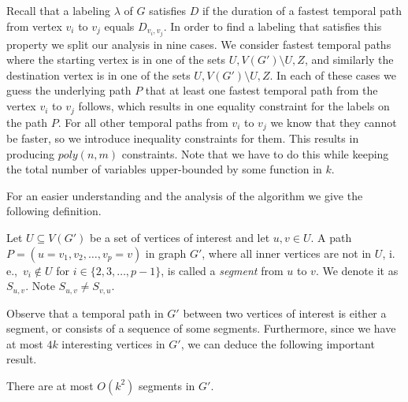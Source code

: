 \documentclass[a4paper,UKenglish,cleveref, autoref, thm-restate]{lipics-v2021}
\newcommand{\ie}{i.\,e.,\ }
\newcommand{\deltaExact}{\textsc{Periodic TGR}}
\begin{document}
Recall that a labeling $\lambda$ of $G$ satisfies $D$ if the duration of a fastest temporal path from vertex $v_i$ to $v_j$ equals $D_{v_i, v_j}$.
In order to find a labeling that satisfies this property we split our analysis in nine cases.
We consider fastest temporal paths 
where the starting vertex is in one of the sets $U,V(G') \setminus U, Z$,
and similarly the destination vertex is in one of the sets $U,V(G') \setminus U, Z$.
In each of these cases we guess the underlying path $P$ that at least one fastest temporal path from the vertex $v_i$ to $v_j$ follows, 
which results in one equality constraint for the labels on the path $P$. 
For all other temporal paths from $v_i$ to $v_j$ we know that they cannot be faster, so we introduce inequality constraints for them.
This results in producing $poly(n,m)$ constraints. 
Note that we have to do this while keeping the total number of variables upper-bounded by some function in $k$.

For an easier understanding and the analysis of the algorithm we give the following definition.
\begin{definition}
    Let $U \subseteq V(G')$ be a set of vertices of interest and let $u,v \in U$.
    A path $P = (u=v_1,v_2, \dots, v_p = v)$  in graph $G'$, where all inner vertices are not in $U$, \ie $v_i \notin U$ for $i \in \{ 2, 3, \dots, p-1\}$,
    is called a \emph{segment} from $u$ to $v$. We denote it as $S_{u,v}$.
    Note $S_{u,v} \neq S_{v,u}$.
\end{definition}
Observe that a temporal path in $G'$ between two vertices of interest is either a segment, or consists of a sequence of some segments. Furthermore, since we have at most $4k$ interesting vertices in $G'$, we can deduce the following important result.
\begin{corollary}\label{obs:FPT-k2segments}
    There are at most $O(k^2)$ segments in $G'$.
\end{corollary}
\end{document}
